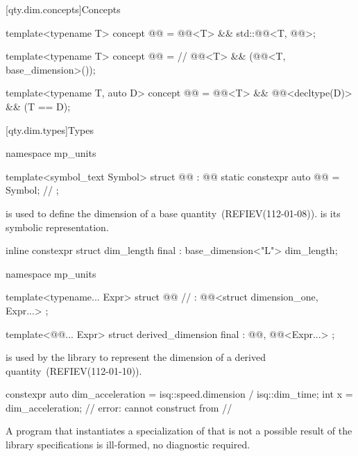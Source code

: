 [qty.dim.concepts]{Concepts}

\begin{itemdecl}
template<typename T>
concept @@ = @@<T> && std::@@<T, @@>;

template<typename T>
concept @@ =  // \expos
  @@<T> && (@@<T, base_dimension>());

template<typename T, auto D>
concept @@ = @@<T> && @@<decltype(D)> && (T{} == D);
\end{itemdecl}

[qty.dim.types]{Types}

\begin{codeblock}
namespace mp_units {

template<symbol_text Symbol>
struct @@ : @@ {
  static constexpr auto @@ = Symbol;  // \expos
};

}
\end{codeblock}

\pnum
{} is used
to define the dimension of a base quantity~(REFIEV(112-01-08)).
 is its symbolic representation.
\begin{example}
\begin{codeblock}
inline constexpr struct dim_length final : base_dimension<"L"> {} dim_length;
\end{codeblock}
\end{example}

\begin{codeblock}
namespace mp_units {

template<typename... Expr>
struct @@  // \expos
    : @@<struct dimension_one, Expr...> {};

template<@@... Expr>
struct derived_dimension final : @@, @@<Expr...> {};

}
\end{codeblock}

\pnum
{} is used by the library
to represent the dimension of a derived quantity~(REFIEV(112-01-10)).
\begin{example}
\begin{codeblock}
constexpr auto dim_acceleration = isq::speed.dimension / isq::dim_time;
int x = dim_acceleration;  // error: cannot construct from
  // 
\end{codeblock}
\end{example}
A program that instantiates a specialization of 
that is not a possible result of the library specifications
is ill-formed, no diagnostic required.

